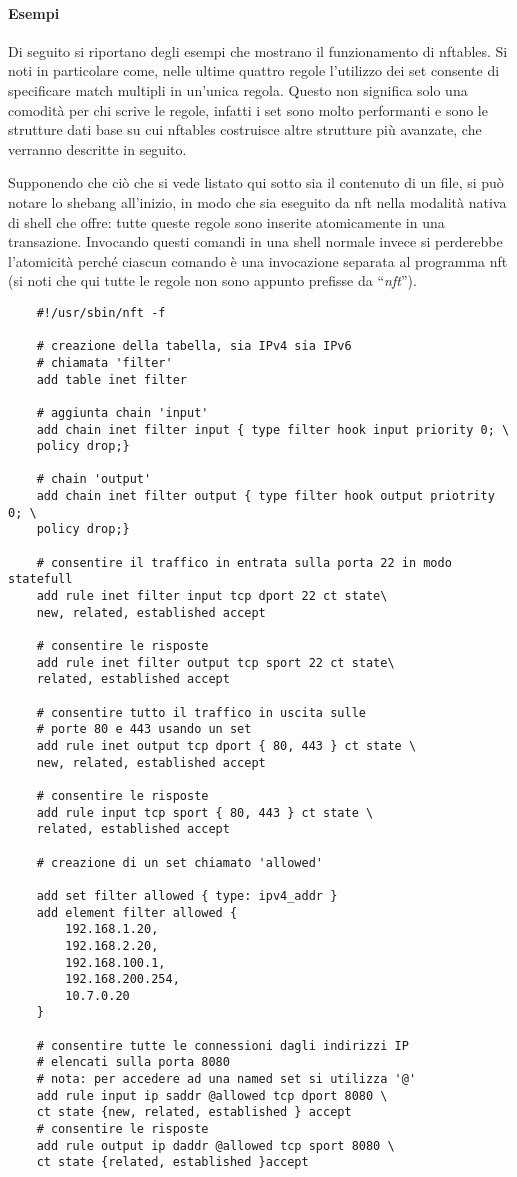 \paragraph{Esempi}
Di seguito si riportano degli esempi che mostrano il funzionamento di nftables.
Si noti in particolare come, nelle ultime quattro regole l'utilizzo dei set
consente di specificare match multipli in un'unica regola. Questo non significa
solo una comodità per chi scrive le regole, infatti i set sono molto performanti
e sono le strutture dati base su cui nftables costruisce altre strutture
più avanzate, che verranno descritte in seguito.

Supponendo che ciò che si vede listato qui sotto sia il contenuto di un file,
si può notare lo shebang all'inizio, in modo che sia eseguito da nft nella
modalità nativa di shell che offre: tutte queste regole sono inserite atomicamente
in una transazione. Invocando questi comandi in una shell normale invece si
perderebbe l'atomicità perché ciascun comando è una invocazione separata al programma nft
(si noti che qui tutte le regole non sono appunto prefisse da ``\textit{nft}'').
\begin{verbatim}
	#!/usr/sbin/nft -f
	
	# creazione della tabella, sia IPv4 sia IPv6
	# chiamata 'filter'
	add table inet filter
	
	# aggiunta chain 'input'
	add chain inet filter input { type filter hook input priority 0; \
	policy drop;}
	
	# chain 'output'
	add chain inet filter output { type filter hook output priotrity 0; \
	policy drop;}
	
	# consentire il traffico in entrata sulla porta 22 in modo statefull
	add rule inet filter input tcp dport 22 ct state\
	new, related, established accept
	
	# consentire le risposte
	add rule inet filter output tcp sport 22 ct state\
	related, established accept
	
	# consentire tutto il traffico in uscita sulle
	# porte 80 e 443 usando un set
	add rule inet output tcp dport { 80, 443 } ct state \
	new, related, established accept
	
	# consentire le risposte
	add rule input tcp sport { 80, 443 } ct state \
	related, established accept
	
	# creazione di un set chiamato 'allowed'
	
	add set filter allowed { type: ipv4_addr }
	add element filter allowed {
		192.168.1.20,
		192.168.2.20,
		192.168.100.1,
		192.168.200.254,
		10.7.0.20
	}
	
	# consentire tutte le connessioni dagli indirizzi IP
	# elencati sulla porta 8080
	# nota: per accedere ad una named set si utilizza '@'
	add rule input ip saddr @allowed tcp dport 8080 \
	ct state {new, related, established } accept
	# consentire le risposte
	add rule output ip daddr @allowed tcp sport 8080 \
	ct state {related, established }accept
\end{verbatim}
